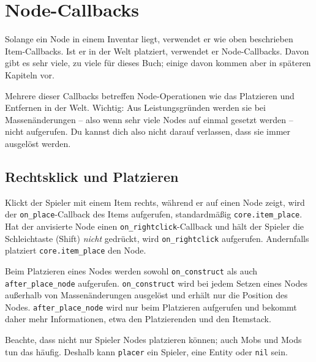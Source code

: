 \section{Node-Callbacks}\label{node-callbacks}

Solange ein Node in einem Inventar liegt, verwendet er wie oben
beschrieben Item-Callbacks. Ist er in der Welt platziert, verwendet er
Node-Callbacks. Davon gibt es sehr viele, zu viele für dieses Buch;
einige davon kommen aber in späteren Kapiteln vor.

Mehrere dieser Callbacks betreffen Node-Operationen wie das Platzieren
und Entfernen in der Welt. Wichtig: Aus Leistungsgründen werden sie bei
Massenänderungen -- also wenn sehr viele Nodes auf einmal gesetzt werden
-- nicht aufgerufen. Du kannst dich also nicht darauf verlassen, dass
sie immer ausgelöst werden.

\subsection{Rechtsklick und
Platzieren}\label{rechtsklick-und-platzieren}

Klickt der Spieler mit einem Item rechts, während er auf einen Node
zeigt, wird der \texttt{on\_\allowbreak{}place}-Callback des Items
aufgerufen, standardmäßig
\texttt{core.\allowbreak{}item\_\allowbreak{}place}. Hat der anvisierte
Node einen \texttt{on\_\allowbreak{}rightclick}-Callback und hält der
Spieler die Schleichtaste (Shift) \emph{nicht} gedrückt, wird
\texttt{on\_\allowbreak{}rightclick} aufgerufen. Andernfalls platziert
\texttt{core.\allowbreak{}item\_\allowbreak{}place} den Node.

Beim Platzieren eines Nodes werden sowohl
\texttt{on\_\allowbreak{}construct}
als auch
\texttt{after\_\allowbreak{}place\_\allowbreak{}node}
aufgerufen. \texttt{on\_\allowbreak{}construct} wird bei jedem Setzen
eines Nodes außerhalb von Massenänderungen ausgelöst und erhält nur die
Position des Nodes.
\texttt{after\_\allowbreak{}place\_\allowbreak{}node} wird nur beim
Platzieren aufgerufen und bekommt daher mehr Informationen, etwa den
Platzierenden und den Itemstack.

Beachte, dass nicht nur Spieler Nodes platzieren können; auch Mobs und
Mods tun das häufig. Deshalb kann \texttt{placer} ein Spieler, eine
Entity oder \texttt{nil} sein.

